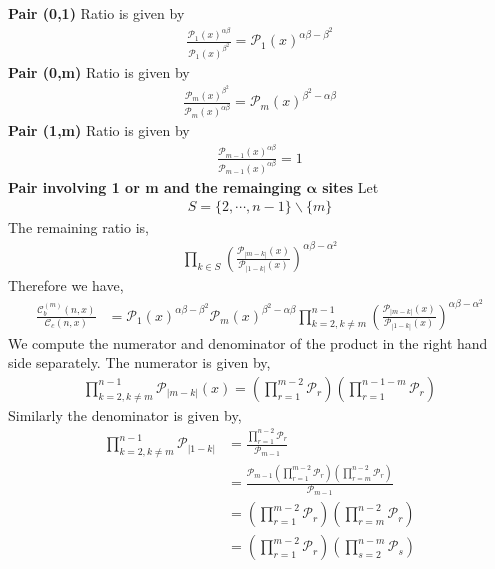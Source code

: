 \documentclass[11pt]{article}
\newcommand{\lb}{\left(}
\newcommand{\rb}{\right)}
\begin{document}
\textbf{Pair (0,1)}
Ratio is given by
\begin{align}
    \frac{\mathcal{P}_1(x)^{\alpha\beta}}{\mathcal{P}_1(x)^{\beta^2}} = \mathcal{P}_1(x)^{\alpha\beta-\beta^2}
\end{align}
\textbf{Pair (0,m)}
Ratio is given by
\begin{align}
    \frac{\mathcal{P}_m(x)^{\beta^2}}{\mathcal{P}_m(x)^{\alpha\beta}} = \mathcal{P}_m(x)^{\beta^2-\alpha\beta}
\end{align}
\textbf{Pair (1,m)}
Ratio is given by
\begin{align}
    \frac{\mathcal{P}_{m-1}(x)^{\alpha\beta}}{\mathcal{P}_{m-1}(x)^{\alpha\beta}} = 1
\end{align}
\textbf{Pair involving 1 or m and the remainging $\mathbf{\alpha}$ sites}
Let 
\begin{align}
    S = \{2,\cdots,n-1\} \backslash \{m\}
\end{align}
The remaining ratio is,
\begin{align}
    \prod_{k\in S} \lb\frac{\mathcal{P}_{|m-k|}(x)}{\mathcal{P}_{|1-k|}(x)}\rb^{\alpha\beta - \alpha^2}
\end{align}
Therefore we have,
\begin{align}
    \frac{\mathcal{C}_b^{(m)}(n,x)
    }{\mathcal{C}_c(n,x)}&= \mathcal{P}_1(x)^{\alpha\beta-\beta^2} \mathcal{P}_m(x)^{\beta^2-\alpha\beta}\prod_{k = 2, k\neq m}^{n-1} \lb\frac{\mathcal{P}_{|m-k|}(x)}{\mathcal{P}_{|1-k|}(x)}\rb^{\alpha\beta - \alpha^2}
\end{align}
We compute the numerator and denominator of the product in the right hand side separately. 
The numerator is given by,
\begin{align}
    \prod_{k = 2, k\neq m}^{n-1} \mathcal{P}_{|m-k|}(x) = \lb  \prod_{r=1}^{m-2}\mathcal{P}_r \rb\lb\prod_{r=1}^{n-1-m}\mathcal{P}_r\rb
\end{align}
Similarly the denominator is given by,
\begin{align}
    \prod_{k = 2, k\neq m}^{n-1}\mathcal{P}_{|1-k|} &=  \frac{\prod_{r=1}^{n-2}\mathcal{P}_r}{\mathcal{P}_{m-1}}\\
    &= \frac{\mathcal{P}_{m-1} \lb\prod_{r=1}^{m-2}\mathcal{P}_r\rb\lb\prod_{r=m}^{n-2}\mathcal{P}_r\rb}{\mathcal{P}_{m-1}} \\
    &= \lb\prod_{r=1}^{m-2}\mathcal{P}_r\rb\lb\prod_{r=m}^{n-2}\mathcal{P}_r\rb \\
    &= \lb\prod_{r=1}^{m-2}\mathcal{P}_r\rb\lb\prod_{s=2}^{n-m}\mathcal{P}_s\rb
\end{align}
\end{document}
